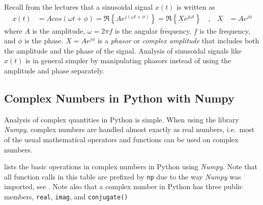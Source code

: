 Recall from the lectures that a sinusoidal signal $x(t)$ is written as 
\begin{align}
	x(t)&= A cos(\omega t + \phi) = \Re\left\{ A e^{j(\omega t + \phi)} \right\} 
		=  \Re\left\{ X e^{j\omega t} \right\} \quad , &
	X &= A e^{j\phi} 
\end{align}
where $A$ is the amplitude, $\omega = 2\pi f$ is the angular frequency, $f$ is the frequency, and $\phi$ is the phase. $	X = A e^{j\phi} $ is a \emph{phasor} or \emph{complex amplitude} that includes both the amplitude and the phase of the signal.
Analysis of sinusoidal signals like $x(t)$ is in general simpler by manipulating phasors instead of using the amplitude and phase separately.

\subsection{Complex Numbers in Python with Numpy}
Analysis of complex quantities in Python is simple. When using the library \emph{Numpy}, complex numbers are handled almost exactly as real numbers, i.e.~most of the usual mathematical operators and functions can be used on complex numbers.

 lists the basic operations in complex numbers in Python using \emph{Numpy}. Note that all function calls in this table are prefixed by \texttt{np} due to the way \emph{Numpy }was imported, see . Note also that a complex number in Python has three public members, \texttt{real}, \texttt{imag}, and \texttt{conjugate()}

